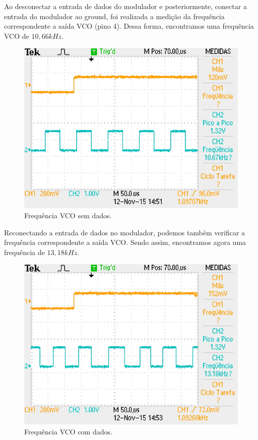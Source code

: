 \documentclass[12pt,a4paper]{article}%
\begin{document}
Ao desconectar a entrada de dados do modulador e posteriormente, conectar a entrada do modulador ao ground, foi realizada a medição da frequência correspondente a saída VCO (pino 4). Dessa forma, encontramos uma frequência VCO de $10,66 kHz$.

\begin{figure}[H]
\centering
\includegraphics[scale=0.5]{imagem/TEK0010}
\caption{Frequência VCO sem dados.}
\label{fig:10}
\end{figure}

Reconectando a entrada de dados no modulador, podemos também verificar a frequência correspondente a saída VCO. Sendo assim, encontramos agora uma frequência de $13,18 kHz$.

\begin{figure}[H]
\centering
\includegraphics[scale=0.5]{imagem/TEK0011}
\caption{Frequência VCO com dados.}
\label{fig:11}
\end{figure}
\end{document}
